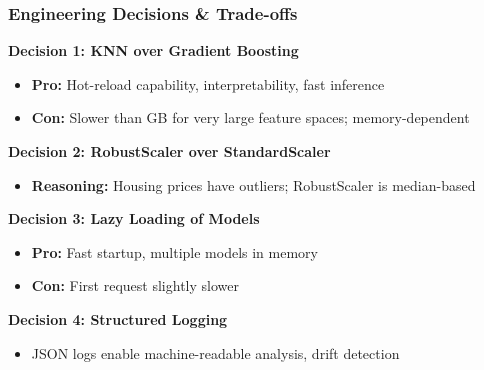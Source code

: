 \documentclass[aspectratio=169]{beamer}
\begin{document}
\begin{frame}
\frametitle{Engineering Decisions \& Trade-offs}

\textbf{Decision 1: KNN over Gradient Boosting}
\begin{itemize}
    \item \textbf{Pro:} Hot-reload capability, interpretability, fast inference
    \item \textbf{Con:} Slower than GB for very large feature spaces; memory-dependent
\end{itemize}

\vspace{0.3cm}
\textbf{Decision 2: RobustScaler over StandardScaler}
\begin{itemize}
    \item \textbf{Reasoning:} Housing prices have outliers; RobustScaler is median-based
\end{itemize}

\vspace{0.3cm}
\textbf{Decision 3: Lazy Loading of Models}
\begin{itemize}
    \item \textbf{Pro:} Fast startup, multiple models in memory
    \item \textbf{Con:} First request slightly slower
\end{itemize}

\vspace{0.3cm}
\textbf{Decision 4: Structured Logging}
\begin{itemize}
    \item JSON logs enable machine-readable analysis, drift detection
\end{itemize}
\end{frame}
\end{document}
